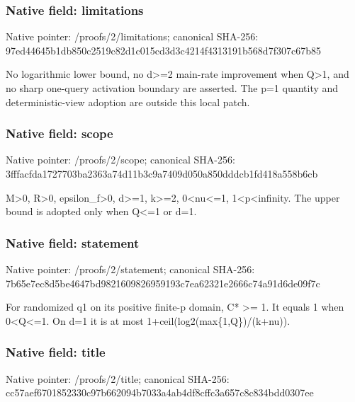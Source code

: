 \documentclass[10pt,a4paper]{article}
\begin{document}
\subsubsection{Native field: limitations}
Native pointer: /proofs/2/limitations; canonical SHA-256: 97ed44645b1db850c2519c82d1c015cd3d3c4214f4313191b568d7f307c67b85

\begingroup\raggedright\sloppy No logarithmic lower bound,\allowbreak{} no d>=\allowbreak{}2 main-rate improvement when Q>1,\allowbreak{} and no sharp one-query activation boundary are asserted. The p=\allowbreak{}1 quantity and deterministic-view adoption are outside this local patch.\par\endgroup

\subsubsection{Native field: scope}
Native pointer: /proofs/2/scope; canonical SHA-256: 3fffacfda1727703ba2363a74d11b3c9a7409d050a850dddcb1fd418a558b6cb

\begingroup\raggedright\sloppy M>0,\allowbreak{} R>0,\allowbreak{} epsilon\_\allowbreak{}f>0,\allowbreak{} d>=\allowbreak{}1,\allowbreak{} k>=\allowbreak{}2,\allowbreak{} 0<nu<=\allowbreak{}1,\allowbreak{} 1<p<infinity. The upper bound is adopted only when Q<=\allowbreak{}1 or d=\allowbreak{}1.\par\endgroup

\subsubsection{Native field: statement}
Native pointer: /proofs/2/statement; canonical SHA-256: 7b65e7ec8d5be4647bd9821609826959193c7ea62321e2666c74a91d6de09f7c

\begingroup\raggedright\sloppy For randomized q1 on its positive finite-p domain,\allowbreak{} C* >=\allowbreak{} 1. It equals 1 when 0<Q<=\allowbreak{}1. On d=\allowbreak{}1 it is at most 1+ceil(log2(max\{1,\allowbreak{}Q\})/\allowbreak{}(k+nu)).\par\endgroup

\subsubsection{Native field: title}
Native pointer: /proofs/2/title; canonical SHA-256: cc57aef6701852330c97b662094b7033a4ab4df8cffc3a657c8c834bdd0307ee
\end{document}
